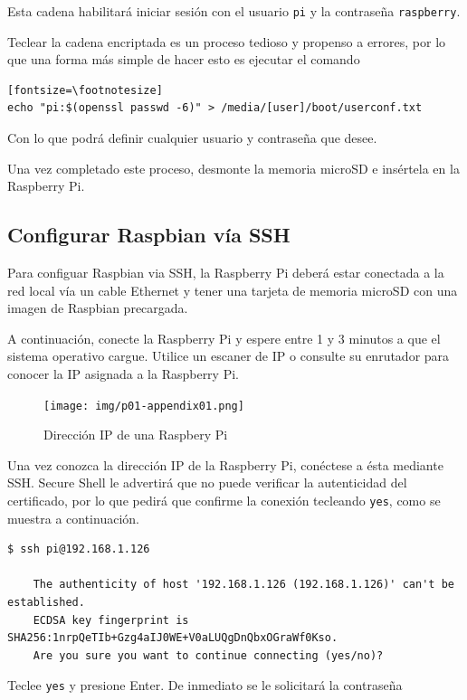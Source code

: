 \documentclass[letterpaper,10.5pt]{article}
\begin{document}
Esta cadena habilitará iniciar sesión con el usuario \texttt{pi} y la contraseña \texttt{raspberry}.

Teclear la cadena encriptada es un proceso tedioso y propenso a errores, por lo que una forma más simple de hacer esto es ejecutar el comando

\begin{verbatim}[fontsize=\footnotesize]
echo "pi:$(openssl passwd -6)" > /media/[user]/boot/userconf.txt
\end{verbatim}

Con lo que podrá definir cualquier usuario y contraseña que desee.

Una vez completado este proceso, desmonte la memoria microSD e insértela en la Raspberry Pi.

\subsection{Configurar Raspbian vía SSH}
Para configuar Raspbian via SSH, la Raspberry Pi deberá estar conectada a la red local vía un cable Ethernet y tener una tarjeta de memoria microSD con una imagen de Raspbian precargada.

A continuación, conecte la Raspberry Pi y espere entre 1 y 3 minutos a que el sistema operativo cargue.
Utilice un escaner de IP o consulte su enrutador para conocer la IP asignada a la Raspberry Pi.

\begin{figure}[H]
	\centering%
	\texttt{[image: img/p01-appendix01.png]} %
	\caption{Dirección IP de una Raspbery Pi}
	\label{fig:raspberry-ip} %
\end{figure}

Una vez conozca la dirección IP de la Raspberry Pi, conéctese a ésta mediante SSH. %
Secure Shell le advertirá que no puede verificar la autenticidad del certificado, por lo que pedirá que confirme la conexión tecleando \texttt{yes}, como se muestra a continuación.

\begin{Verbatim}[fontsize=\footnotesize]
$ ssh pi@192.168.1.126

    The authenticity of host '192.168.1.126 (192.168.1.126)' can't be established.
    ECDSA key fingerprint is SHA256:1nrpQeTIb+Gzg4aIJ0WE+V0aLUQgDnQbxOGraWf0Kso.
    Are you sure you want to continue connecting (yes/no)?
\end{Verbatim}

Teclee \texttt{yes} y presione Enter.
De inmediato se le solicitará la contraseña
\end{document}
